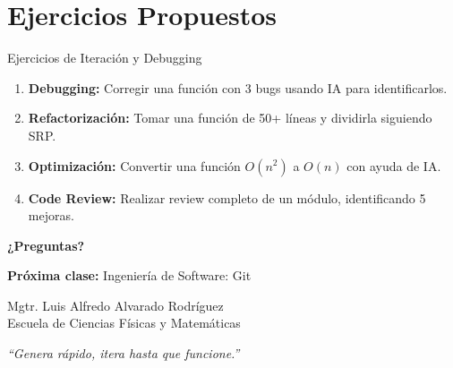 \documentclass[aspectratio=169]{beamer}
\begin{document}
\section{Ejercicios Propuestos}

\begin{frame}{Ejercicios de Iteración y Debugging}
    \begin{enumerate}
        \setlength\itemsep{0.8em}
        \item \textbf{Debugging:} Corregir una función con 3 bugs usando IA para identificarlos.
        
        \item \textbf{Refactorización:} Tomar una función de 50+ líneas y dividirla siguiendo SRP.
        
        \item \textbf{Optimización:} Convertir una función $O(n^2)$ a $O(n)$ con ayuda de IA.
        
        \item \textbf{Code Review:} Realizar review completo de un módulo, identificando 5 mejoras.

    \end{enumerate}
\end{frame}

\begin{frame}
    \centering
    \Huge \textbf{¿Preguntas?}
    
    \vspace{0.8cm}
    \large
    \textbf{Próxima clase:} Ingeniería de Software: Git
    
    \vspace{0.5cm}
    \normalsize
    Mgtr. Luis Alfredo Alvarado Rodríguez\\
    \small Escuela de Ciencias Físicas y Matemáticas
    
    \vspace{0.5cm}
    \footnotesize
    \textit{``Genera rápido, itera hasta que funcione.''}
\end{frame}
\end{document}
